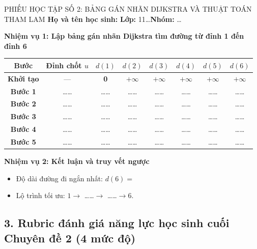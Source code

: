 \documentclass[12pt, a4paper]{article}
\begin{document}
\begin{pedabox}{PHIẾU HỌC TẬP SỐ 2: BẢNG GÁN NHÃN DIJKSTRA VÀ THUẬT TOÁN THAM LAM}
    \textbf{Họ và tên học sinh:} \dotfill \textbf{Lớp:} 11\dots \textbf{Nhóm:} \dots

    \textbf{Nhiệm vụ 1: Lập bảng gán nhãn Dijkstra tìm đường từ đỉnh 1 đến đỉnh 6}
    \begin{center}
    \begin{tabular}{|c|c|c|c|c|c|c|c|}
    \hline
    \textbf{Bước} & \textbf{Đỉnh chốt $u$} & $d(1)$ & $d(2)$ & $d(3)$ & $d(4)$ & $d(5)$ & $d(6)$ \\ \hline
    \textbf{Khởi tạo} & --- & \textbf{0} & $+\infty$ & $+\infty$ & $+\infty$ & $+\infty$ & $+\infty$ \\ \hline
    \textbf{Bước 1} & \dots\dots & \dots\dots & \dots\dots & \dots\dots & \dots\dots & \dots\dots & \dots\dots \\ \hline
    \textbf{Bước 2} & \dots\dots & \dots\dots & \dots\dots & \dots\dots & \dots\dots & \dots\dots & \dots\dots \\ \hline
    \textbf{Bước 3} & \dots\dots & \dots\dots & \dots\dots & \dots\dots & \dots\dots & \dots\dots & \dots\dots \\ \hline
    \textbf{Bước 4} & \dots\dots & \dots\dots & \dots\dots & \dots\dots & \dots\dots & \dots\dots & \dots\dots \\ \hline
    \textbf{Bước 5} & \dots\dots & \dots\dots & \dots\dots & \dots\dots & \dots\dots & \dots\dots & \dots\dots \\ \hline
    \end{tabular}
    \end{center}

    \textbf{Nhiệm vụ 2: Kết luận và truy vết ngược}
    \begin{itemize}[leftmargin=0.6cm]
        \item Độ dài đường đi ngắn nhất: $d(6) = $ \dotfill
        \item Lộ trình tối ưu: $1 \to$ \dots\dots $\to$ \dots\dots $\to 6$.
    \end{itemize}
\end{pedabox}

\subsection*{3. Rubric đánh giá năng lực học sinh cuối Chuyên đề 2 (4 mức độ)}
\end{document}
